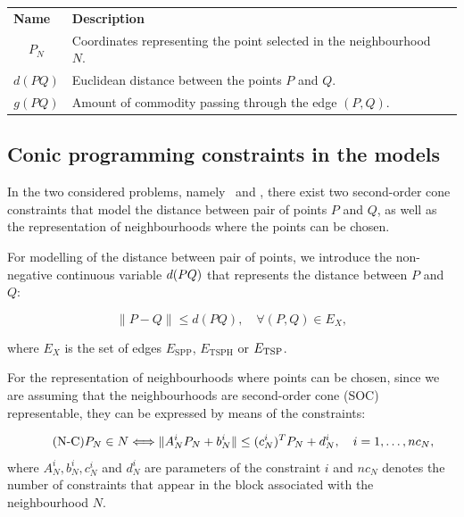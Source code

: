 \documentclass[a4paper,  review, authoryear, 1p.]{elsarticle}
\newcommand{\SPPN}{{\sf{H-SPPN}\xspace }}
\newcommand{\TSPN}{{\sf{H-TSPN}\xspace }}
\newcommand{\ESPP}{{E_{\text{SPP}}}}
\newcommand{\ETSPH}{{E_{\text{TSPH}}}}
\begin{document}
\begin{table}[h!]
\begin{tabular}{|cl|l}
				\multicolumn{1}{|l|}{\textbf{Name}} & \textbf{Description} &  \\ \cline{1-2}
				\multicolumn{1}{|c|}{$P_N$} & Coordinates representing the point selected in the neighbourhood $N$. &  \\ \cline{1-2}
				\multicolumn{1}{|c|}{$d(PQ)$} & Euclidean distance between the points $P$ and $Q$. &  \\ \cline{1-2}
				\multicolumn{1}{|c|}{$g(PQ)$} & Amount of commodity passing through the edge $(P, Q)$. &  \\ \cline{1-2}
			\end{tabular}
		\end{table}
		
		\subsection{Conic programming constraints in the models}
		 In the two considered  problems, namely \SPPN \ and \TSPN, there exist two second-order cone constraints that model the distance between  pair of points $P$ and $Q$, as well as the representation of neighbourhoods where the points can be chosen.
		
		\newcommand{\dvar}[2]{d(#1#2)}
		
		For modelling of the distance between pair of points, we introduce the non-negative continuous variable $\dvar{PQ}$ that represents the distance between $P$ and $Q$:
		
		
		\begin{equation*}\tag{d-C}\label{eq:dC}
			\|P - Q\|\leq \dvar{P}{Q},\quad\forall (P,Q)\in E_X,
		\end{equation*}
		
		where $E_X$ is the set of edges $\ESPP$, $\ETSPH$ or $E_{\rm{TSP}}$.
		
		For the representation of neighbourhoods where points can be chosen, since we are assuming that the neighbourhoods are second-order cone (SOC) representable, they can be expressed by means of the constraints:
		
		\begin{equation*}\tag{N-C}\label{eq:nC}
			P_N\in N \Longleftrightarrow
			\|A_N^i P_N + b_N^i\| \leq (c_N^i)^T P_N + d_N^i,\quad i=1,\ldots,nc_N, \\
		\end{equation*}
		where $A_N^i, b_N^i, c_N^i$ and $d_N^i$ are parameters of the constraint $i$ and $nc_N$ denotes the number of constraints that appear in the block associated with the neighbourhood $N$.
		
\end{document}
